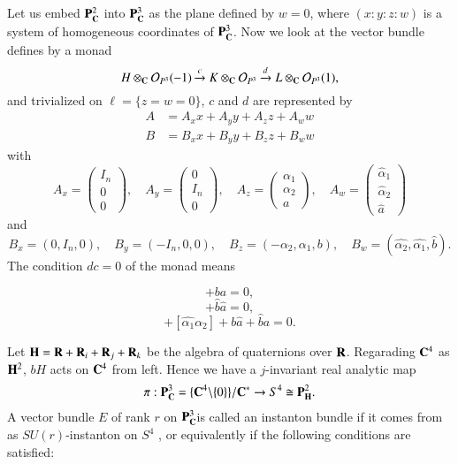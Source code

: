 Let us embed $\mathbf{P}_{\mathbf{C}}^{2}$ into $\mathbf{P}_{\mathbf{C}}^{3}$ as the plane defined by $w =0$, where $(x : y : z : w)$ is a system of homogeneous coordinates of $\mathbf{P}_{\mathbf{C}}^{3}$. Now we look at the vector bundle defines by a monad
$$
H \otimes_{\mathbf{C}} \mathcal{O}_{P^{3}}(-1) \xrightarrow{c} K \otimes_{\mathbf{C}}\mathcal{O}_{P^{3}} \xrightarrow{d} L \otimes_{\mathbf{C}}\mathcal{O}_{P^{3}}(1),
$$
and trivialized on $\ell =\{z=w=0\}$, $c$ and $d$ are represented by
\begin{align*}
A &= A_{x}x + A_{y}y + A_{z}z + A_{w}w\\
B &=B_{x}x + B_{y}y +B_{z}z+B_{w}w
\end{align*}
with
$$
A_{x} = \begin{pmatrix}
I_{n}\\
0\\
0
\end{pmatrix}
,\quad A_{y}=
\begin{pmatrix}
0\\
I_{n}\\
0
\end{pmatrix}
,\quad A_{z}=
\begin{pmatrix}
\alpha_{1}\\
\alpha_{2}\\
a
\end{pmatrix}
,\quad A_{w} =
\begin{pmatrix}
\hat{\alpha}_{1}\\
\hat{\alpha}_{2}\\
\hat{a}
\end{pmatrix}
$$
and
$$
B_{x}= (0,I_{n}, 0), \quad B_{y}=(-I_{n}, 0,0), \quad B_{z} =(-\alpha_{2}, \alpha_{1}, b), \quad B_{w} =(\hat{\alpha_{2}}, \hat{\alpha_{1}}, \hat{b}).
$$
The condition $dc =0$ of the monad means

\begin{equation}
[\alpha_{1}, \alpha_{2}] +ba = 0,\tag{1.4.1}\label{art12-eq-1.4.1}
\end{equation}
\begin{equation}
[\hat{\alpha_{1}}, \hat{\alpha_{2}}] +\hat{b}\hat{a} = 0,\tag{1.4.2}
\end{equation}
\begin{equation}
[\alpha_{1}, \hat{\alpha_{2}}] +[\hat{\alpha_{1}}\alpha_{2}] + b \hat{a}+ \hat{b}a = 0.\tag{1.4.3}\label{art12-eq-1.4.3}
\end{equation}

Let $\mathbf{H} =\mathbf{R} +\mathbf{R}_{i} + \mathbf{R}_{j} + \mathbf{R}_{k}$ be the algebra of quaternions over $\mathbf{R}$. Regarading $\mathbf{C}^{4}$ as $\mathbf{H}^{2}$, $bH$ acts on $\mathbf{C}^{4}$ from left. Hence we have a $j$-invariant real analytic map
$$
\pi : \mathbf{P}^{3}_{\mathbf{C}} = \{\mathbf{C}^{4}\backslash \{0\}\}/{\mathbf{C}}^{*} \rightarrow S^{4} \cong \mathbf{P}_{\mathbf{H}}^{2}.
$$
A vector bundle $E$ of rank $r$ on $\mathbf{P}_{\mathbf{C}}^{3}$is called an instanton bundle if it comes from as $SU(r)$-instanton on $S^{4}$ , or equivalently if the following conditions are satisfied:

